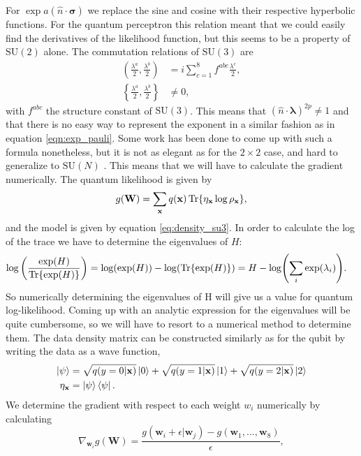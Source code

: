 For $\exp{{a(\hat{n}\cdot\bm{\sigma})}}$ we replace the sine and cosine with their respective hyperbolic functions. For the quantum perceptron this relation meant that we could easily find the derivatives of the likelihood function, but this seems to be a property of $\text{SU}(2)$ alone. The commutation relations of $\text{SU}(3)$ are
\begin{align*}
    \left(\frac{\lambda^a}{2}, \frac{\lambda^b}{2}\right) &=  i \sum_{c=1}^8 f^{abc} \frac{\lambda^c}{2},\\
    \left\{\frac{\lambda^a}{2}, \frac{\lambda^b}{2}\right\} & \neq 0,
\end{align*}
with $f^{abc}$ the structure constant of $\text{SU}(3)$. This means that $(\hat{n}\cdot\bm{\lambda})^{2p} \neq 1$ and that there is no easy way to represent the exponent in a similar fashion as in equation \ref{eqn:exp_pauli}. Some work has been done to come up with such a formula nonetheless, but it is not as elegant as for the $2\times2$ case, and hard to generalize to $\text{SU}(N)$ \cite{Curtright2015}. This means that we will have to calculate the gradient numerically. The quantum likelihood is given by
\begin{equation*}
    g(\mathbf{W}) = \sum_{\mathbf{x}} q(\mathbf{x}) \Tr{\eta_\mathbf{x} \log \rho_\mathbf{x}},
\end{equation*}
and the model is given by equation \ref{eq:density_su3}. In order to calculate the log of the trace we have to determine the eigenvalues of $H$:
\begin{align*}
    \log\left(\frac{\exp(H)}{\Tr{\exp(H)}}\right) &= \log(\exp(H)) - \log(\Tr{\exp(H)}) = H - \log(\sum_i \exp(\lambda_i)).
\end{align*}
So numerically determining the eigenvalues of H will give us a value for quantum log-likelihood.
Coming up with an analytic expression for the eigenvalues will be quite cumbersome, so we will have to resort to a numerical method to determine them. The data density matrix can be constructed similarly as for the qubit by writing the data as a wave function,
\begin{align*}
    \ket{\psi} &= \sqrt{q(y=0|\mathbf{x})}\ket{0} + \sqrt{q(y=1|\mathbf{x})}\ket{1} + \sqrt{q(y=2|\mathbf{x})}\ket{2}\\
    \eta_\mathbf{x} &= \ket{\psi}\bra{\psi}.
\end{align*}
We determine the gradient with respect to each weight $w_i$ numerically by calculating
\begin{equation*}
    \nabla_{\mathbf{w}_i} g(\mathbf{W})  = \frac{g(\mathbf{w}_i + \epsilon | \mathbf{w}_j ) - g(\mathbf{w}_1,\ldots,\mathbf{w}_8 ) }{\epsilon},
\end{equation*}
